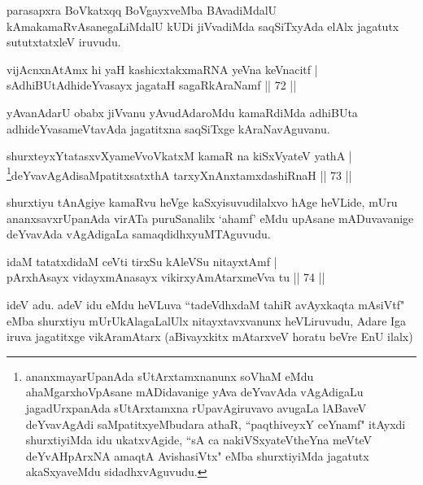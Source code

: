 \begin{artha}
parasapxra BoVkatxqq BoVgayxveMba BAvadiMdalU kAmakamaRvAsanegaLiMdalU kUDi jiVvadiMda saqSiTxyAda elAlx jagatutx sututxtatxleV iruvudu.
\end{artha}


\begin{shl}
vijAcnxnAtAmx hi yaH kashicxtakxmaRNA yeVna keVnacitf |\\
sAdhiBUtAdhideYvasayx jagataH sagaRkAraNamf \hfill || 72 ||
\end{shl}

\begin{artha}
yAvanAdarU obabx jiVvanu yAvudAdaroMdu kamaRdiMda adhiBUta adhideYvasameVtavAda jagatitxna saqSiTxge kAraNavAguvanu.
\end{artha}
 
\begin{shl}
shurxteyxYtatasxvXyameVvoVkatxM kamaR na kiSxVyateV yathA |\\
\footnote{ananxmayarUpanAda sUtArxtamxnanunx soV\s haM eMdu ahaMgarxhoVpAsane mADidavanige yAva deYvavAda vAgAdigaLu jagadUrxpanAda sUtArxtamxna rUpavAgiruvavo avugaLa lABaveV deYvavAgAdi saMpatitxyeMbudara athaR, ``paqthiveyxY ceYnamf" itAyxdi shurxtiyiMda idu ukatxvAgide, ``sA ca nakiVSxyateV\s theYna meVteV deYvAHpArxNA amaqtA AvishasiVtx" eMba shurxtiyiMda jagatutx akaSxyaveMdu sidadhxvAguvudu.}deYvavAgAdisaMpatitxsatxthA tarxyXnAnxtamxdashiRnaH \hfill || 73 ||
\end{shl}

\begin{artha}
shurxtiyu tAnAgiye kamaRvu heVge kaSxyisuvudilalxvo hAge heVLide, mUru ananxsavxrUpanAda virATa puruSanalilx `ahamf' eMdu upAsane mADuvavanige deYvavAda vAgAdigaLa samaqdidhxyuMTAguvudu.
\end{artha}


\begin{shl}
idaM tatatxdidaM ceVti tirxSu kAleVSu nitayxtAmf |\\
pArxhAsayx vidayxmAnasayx vikirxyAmAtarxmeVva tu \hfill || 74 ||
\end{shl}

\begin{artha}
ideV adu. adeV idu eMdu heVLuva ``tadeVdhxdaM tahiR avAyxkaqta mAsiVtf" eMba shurxtiyu mUrUkAlagaLalUlx nitayxtavxvanunx heVLiruvudu, Adare Iga iruva jagatitxge vikAramAtarx (aBivayxkitx mAtarxveV horatu beVre EnU ilalx)
\end{artha}

